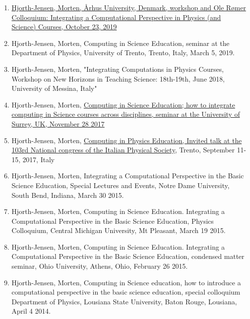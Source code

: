 \documentclass[aps,floatfix,preprint]{revtex4-1}
\begin{document}
\begin{enumerate}
\item \href{{https://phys.au.dk/en/news/item/artikel/ole-roemer-colloquium-morten-hjort-jensen-tba/}}{Hjorth-Jensen, Morten, Århus University, Denmark, workshop and  Ole Rømer Colloquium: Integrating a Computational Perspective in Physics (and Science) Courses, October 23, 2019}

\item Hjorth-Jensen, Morten, Computing in Science Education, seminar at the Department of Physics, University of Trento, Trento, Italy, March 5, 2019.

\item Hjorth-Jensen, Morten, "Integrating Computations in Physics Courses, Workshop on New Horizons in Teaching Science: 18th-19th, June 2018, University of Messina, Italy"

\item Hjorth-Jensen, Morten, \href{{http://www.nucleartheory.net/NPG/recent_seminars.htm}}{Computing in Science Education; how to integrate computing in Science courses across disciplines, seminar at the University of Surrey, UK, November 28 2017}

\item Hjorth-Jensen, Morten, \href{{https://www.sif.it/attivita/congresso/103}}{Computing in Physics Education, Invited talk at the 103rd National congress of the Italian Physical Society}, Trento, September 11-15, 2017, Italy

\item Hjorth-Jensen, Morten, Integrating a Computational Perspective in the Basic Science Education, Special Lectures and Events, Notre Dame University, South Bend, Indiana, March 30 2015.

\item Hjorth-Jensen, Morten, Computing in Science Education.  Integrating a Computational Perspective in the Basic Science Education, Physics Colloquium, Central Michigan University, Mt Pleasant, March 19 2015.

\item Hjorth-Jensen, Morten, Computing in Science Education.  Integrating a Computational Perspective in the Basic Science Education, condensed matter seminar, Ohio University, Athens, Ohio,  February 26 2015.

\item Hjorth-Jensen, Morten, Computing in Science education, how to introduce a computational perspective in the basic science education, special colloquium Department of Physics, Lousiana State University, Baton Rouge, Lousiana, April 4 2014.


\end{enumerate}
\end{document}
